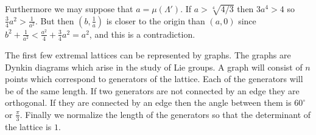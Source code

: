 Furthermore we may suppose that $a=\mu(\Lambda')$.  If $a>\sqrt[4]{4/3}$ then $3a^4>4$ so $\frac{3}{4}a^2>\frac{1}{a^2}$.  But then $(b,\frac{1}{a})$ is closer to the origin than $(a,0)$ since $b^2+\frac{1}{a^2}<\frac{a^2}{4}+\frac{3}{4}a^2=a^2$, and this is a contradiction.

The first few extremal lattices can be represented by graphs.  The graphs are Dynkin diagrams which arise in the study of Lie groups.  A graph will consist of $n$ points which correspond to generators of the lattice.  Each of the generators will be of the same length.  If two generators are not connected by an edge they are orthogonal.  If they are connected by an edge then the angle between them is $60^\circ$ or $\frac{\pi}{3}$.  Finally we normalize the length of the generators so that the determinant of the lattice is $1$.

